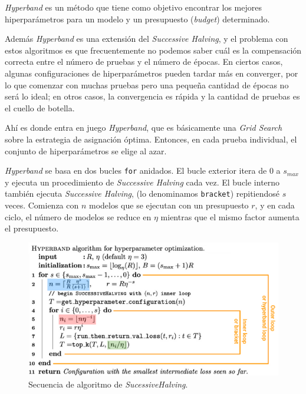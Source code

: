 \documentclass[a4paper,12pt]{article}
\begin{document}
\textit{Hyperband} es un método que tiene como objetivo encontrar los mejores hiperparámetros para un modelo y un presupuesto (\textit{budget}) determinado. 

Además \textit{Hyperband} es una extensión del \textit{Successive Halving}, y el problema con estos algoritmos es que frecuentemente no podemos saber cuál es la compensación correcta entre el número de pruebas y el número de épocas. En ciertos casos, algunas configuraciones de hiperparámetros pueden tardar más en converger, por lo que comenzar con muchas pruebas pero una pequeña cantidad de épocas no será lo ideal; en otros casos, la convergencia es rápida y la cantidad de pruebas es el cuello de botella. \citep{Rosenberg2020Aug}

Ahí es donde entra en juego \textit{Hyperband}, que es básicamente una \textit{Grid Search} sobre la estrategia de asignación óptima. Entonces, en cada prueba individual, el conjunto de hiperparámetros se elige al azar.

\textit{Hyperband} se basa en dos bucles \texttt{for} anidados. El bucle exterior itera de $0$ a $s_{max}$ y ejecuta un procedimiento de \textit{Successive Halving} cada vez. El bucle interno también ejecuta \textit{Successive Halving}, (lo denominamos \texttt{bracket}) repitiendosé $s$ veces. Comienza con $n$ modelos que se ejecutan con un presupuesto $r$, y en cada ciclo, el número de modelos se reduce en $\eta$ mientras que el mismo factor aumenta el presupuesto. \citep{Abraham2021Feb}

\begin{figure}[H]
	\begin{center}
		\includegraphics[width=1\textwidth]{hyperband_algo.png}
		\caption{Secuencia de algoritmo de \textit{SucessiveHalving}.}
		\label{fig:hyper_algo}
	\end{center}
\end{figure}
\end{document}
